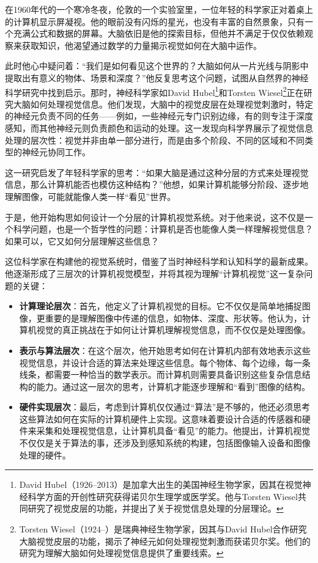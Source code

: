 在1960年代的一个寒冷冬夜，伦敦的一个实验室里，一位年轻的科学家正对着桌上的计算机显示屏凝视。他的眼前没有闪烁的星光，也没有丰富的自然景象，只有一个充满公式和数据的屏幕。大脑依旧是他的探索目标，但他并不满足于仅仅依赖观察来获取知识，他渴望通过数学的力量揭示视觉如何在大脑中运作。

此时他心中疑问着：“我们是如何看见这个世界的？大脑如何从一片光线与阴影中提取出有意义的物体、场景和深度？”他反复思考这个问题，试图从自然界的神经科学研究中找到启示。那时，神经科学家如David Hubel\footnote{David Hubel（1926--2013）是加拿大出生的美国神经生物学家，因其在视觉神经科学方面的开创性研究获得诺贝尔生理学或医学奖。他与Torsten Wiesel共同研究了视觉皮层的功能，并提出了关于视觉信息处理的分层理论。}和Torsten Wiesel\footnote{Torsten Wiesel（1924--）是瑞典神经生物学家，因其与David Hubel合作研究大脑视觉皮层的功能，揭示了神经元如何处理视觉刺激而获诺贝尔奖。他们的研究为理解大脑如何处理视觉信息提供了重要线索。}正在研究大脑如何处理视觉信息。他们发现，大脑中的视觉皮层在处理视觉刺激时，特定的神经元负责不同的任务——例如，一些神经元专门识别边缘，有的则专注于深度感知，而其他神经元则负责颜色和运动的处理。这一发现向科学界展示了视觉信息处理的层次性：视觉并非由单一部分进行，而是由多个阶段、不同的区域和不同类型的神经元协同工作。

这一研究启发了年轻科学家的思考：“如果大脑是通过这种分层的方式来处理视觉信息，那么计算机能否也模仿这种结构？”他想，如果计算机能够分阶段、逐步地理解图像，可能就能像人类一样“看见”世界。

于是，他开始构思如何设计一个分层的计算机视觉系统。对于他来说，这不仅是一个科学问题，也是一个哲学性的问题：计算机是否也能像人类一样理解视觉信息？如果可以，它又如何分层理解这些信息？

这位科学家在构建他的视觉系统时，借鉴了当时神经科学和认知科学的最新成果。他逐渐形成了三层次的计算机视觉模型，并将其视为理解“计算机视觉”这一复杂问题的关键：

\begin{itemize}
    \item \textbf{计算理论层次}：首先，他定义了计算机视觉的目标。它不仅仅是简单地捕捉图像，更重要的是理解图像中传递的信息，如物体、深度、形状等。他认为，计算机视觉的真正挑战在于如何让计算机理解视觉信息，而不仅仅是处理图像。
    
    \item \textbf{表示与算法层次}：在这个层次，他开始思考如何在计算机内部有效地表示这些视觉信息，并设计合适的算法来处理这些信息。每个物体、每个边缘，每一条线条，都需要一种恰当的数学表示。而计算机则需要具备识别这些复杂信息结构的能力。通过这一层次的思考，计算机才能逐步理解和“看到”图像的结构。
    
    \item \textbf{硬件实现层次}：最后，考虑到计算机仅仅通过“算法”是不够的，他还必须思考这些算法如何在实际的计算机硬件上实现。这意味着要设计合适的传感器和硬件来采集和处理视觉信息，让计算机具备“看见”的能力。他提出，计算机视觉不仅仅是关于算法的事，还涉及到感知系统的构建，包括图像输入设备和图像处理的硬件。
\end{itemize}

